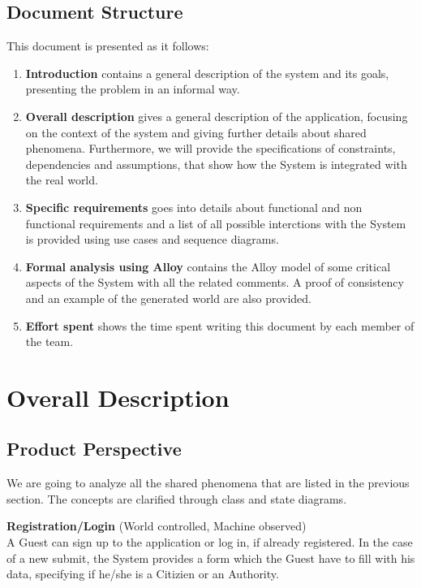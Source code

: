 \documentclass{report}
\begin{document}
\section{Document Structure}
This document is presented as it follows:
\begin{enumerate}
	\item {\textbf{Introduction}} contains a general description of the system and its goals, presenting the problem in an informal way.
	\item{\textbf{Overall description}} gives a general description of the application, focusing on the context of the system and giving further details about shared phenomena. Furthermore, we will provide the specifications of constraints, dependencies and assumptions, that show how the System is integrated with the real world.
	\item{\textbf{Specific requirements}} goes into details about functional and non functional requirements and a list of all possible interctions with the System is provided using use cases and sequence diagrams.
	\item {\textbf{Formal analysis using Alloy}} contains the Alloy model of some critical aspects of the System with all the related comments. A proof of consistency and an example of the generated world are also provided.
	\item {\textbf{Effort spent}} shows the time spent writing this document by each member of the team.
\end{enumerate}

\chapter{Overall Description}
\section{Product Perspective}
We are going to analyze all the shared phenomena that are listed in the previous section. The concepts are clarified through class and state diagrams.\\ \vspace{2mm}

\noindent\textbf{Registration/Login} (World controlled, Machine observed)\\
A Guest can sign up to the application or log in, if already registered. 
In the case of a new submit, the System provides a form which the Guest have to fill with his data, specifying if he/she is 
a Citizien or an Authority.\\ \vspace{2mm}
\end{document}

